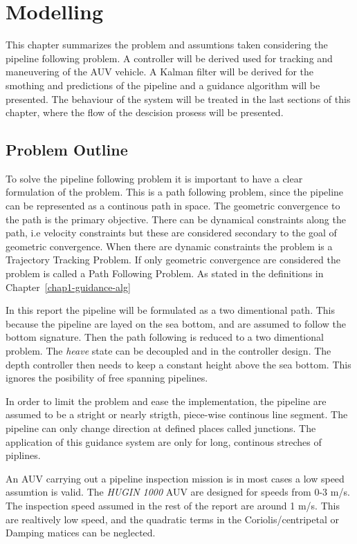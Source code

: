 \chapter{Modelling}
	This chapter summarizes the problem and assumtions taken considering the pipeline following problem.
	A controller will be derived used for tracking and maneuvering of the AUV vehicle. A Kalman filter
	will be derived for the smothing and predictions of the pipeline and a guidance algorithm will be
	presented. The behaviour of the system will be treated in the last sections of this chapter, where the
	flow of the descision prosess will be presented.


\section{Problem Outline}
\label{chap2:problem}
	To solve the pipeline following problem it is important to have a clear formulation of the problem.
	This is a path following problem, since the pipeline can be represented as a continous path in
	space. The geometric convergence to the path is the primary objective. There can be dynamical
	constraints along the path, i.e velocity constraints but these are considered secondary to the goal of
	geometric convergence. When there are dynamic constraints the problem is a Trajectory Tracking
	Problem. If only geometric convergence are considered the problem is called a Path Following Problem.
	As stated in the definitions in Chapter~\ref{chap1-guidance-alg}

	In this report the pipeline will be formulated as a two dimentional path. This because the pipeline
	are layed on the sea bottom, and are assumed to follow the bottom signature. Then the path following
	is reduced to a two dimentional problem. The \textit{heave} state can be decoupled and in the
	controller design. The depth controller then needs to keep a constant height above the sea bottom.
	This ignores the posibility of free spanning pipelines.

	In order to limit the problem and ease the implementation, the pipeline are assumed to be a stright or
	nearly strigth, piece-wise continous line segment. The pipeline can only change direction at defined
	places called junctions. The application of this guidance system are only for long, continous streches of
	piplines. 

	An AUV carrying out a pipeline inspection mission is in most cases a low speed assumtion is valid. The
	\textit{HUGIN 1000} AUV are designed for speeds from 0-3 m/s. The inspection speed assumed in the
	rest of the report are around 1 m/s. This are realtively low speed, and the quadratic terms in the
	Coriolis/centripetal or Damping matices can be neglected. 

